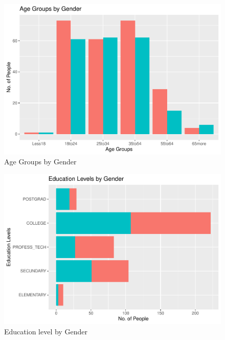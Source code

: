 \documentclass[
11pt, %
oneside, %
english, %
singlespacing, %
]{macthesis} %
\begin{document}
\begin{figure}

{\centering \includegraphics[width=0.85\linewidth]{thesis_files/figure-latex/unnamed-chunk-7-1} 

}

\caption{\label{fig:Age by gender}Age Groups by Gender}\label{fig:unnamed-chunk-7}
\end{figure}
\begin{figure}

{\centering \includegraphics[width=0.85\linewidth]{thesis_files/figure-latex/unnamed-chunk-8-1} 

}

\caption{\label{fig:Education by gender}Education level by Gender}\label{fig:unnamed-chunk-8}
\end{figure}
\end{document}
